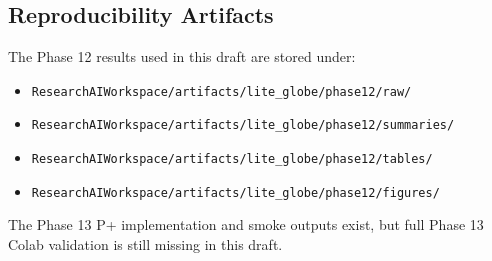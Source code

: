 \subsection{Reproducibility Artifacts}
The Phase 12 results used in this draft are stored under:
\begin{itemize}
    \item \texttt{ResearchAIWorkspace/artifacts/lite\_globe/phase12/raw/}
    \item \texttt{ResearchAIWorkspace/artifacts/lite\_globe/phase12/summaries/}
    \item \texttt{ResearchAIWorkspace/artifacts/lite\_globe/phase12/tables/}
    \item \texttt{ResearchAIWorkspace/artifacts/lite\_globe/phase12/figures/}
\end{itemize}

The Phase 13 P+ implementation and smoke outputs exist, but full Phase 13 Colab validation is still missing in this draft.
